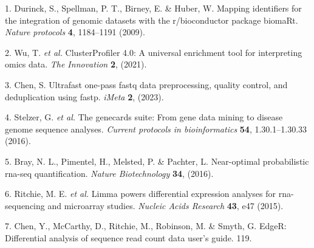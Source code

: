 \documentclass[
]{article}
\newenvironment{cslreferences}%
  {}%
  {\par}
\begin{document}
\hypertarget{refs}{}
\begin{cslreferences}
\leavevmode\hypertarget{ref-MappingIdentifDurinc2009}{}%
1. Durinck, S., Spellman, P. T., Birney, E. \& Huber, W. Mapping identifiers for the integration of genomic datasets with the r/bioconductor package biomaRt. \emph{Nature protocols} \textbf{4}, 1184--1191 (2009).

\leavevmode\hypertarget{ref-ClusterprofilerWuTi2021}{}%
2. Wu, T. \emph{et al.} ClusterProfiler 4.0: A universal enrichment tool for interpreting omics data. \emph{The Innovation} \textbf{2}, (2021).

\leavevmode\hypertarget{ref-UltrafastOnePChen2023}{}%
3. Chen, S. Ultrafast one-pass fastq data preprocessing, quality control, and deduplication using fastp. \emph{iMeta} \textbf{2}, (2023).

\leavevmode\hypertarget{ref-TheGenecardsSStelze2016}{}%
4. Stelzer, G. \emph{et al.} The genecards suite: From gene data mining to disease genome sequence analyses. \emph{Current protocols in bioinformatics} \textbf{54}, 1.30.1--1.30.33 (2016).

\leavevmode\hypertarget{ref-NearOptimalPrBray2016}{}%
5. Bray, N. L., Pimentel, H., Melsted, P. \& Pachter, L. Near-optimal probabilistic rna-seq quantification. \emph{Nature Biotechnology} \textbf{34}, (2016).

\leavevmode\hypertarget{ref-LimmaPowersDiRitchi2015}{}%
6. Ritchie, M. E. \emph{et al.} Limma powers differential expression analyses for rna-sequencing and microarray studies. \emph{Nucleic Acids Research} \textbf{43}, e47 (2015).

\leavevmode\hypertarget{ref-EdgerDifferenChen}{}%
7. Chen, Y., McCarthy, D., Ritchie, M., Robinson, M. \& Smyth, G. EdgeR: Differential analysis of sequence read count data user's guide. 119.
\end{cslreferences}
\end{document}
